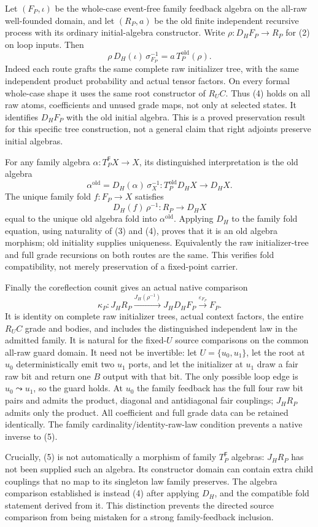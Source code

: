 \documentclass[11pt]{article}
\begin{document}
Let $(F_P,\iota)$ be the whole-case event-free family feedback algebra on the all-raw well-founded domain, and let $(R_P,a)$ be the old finite independent recursive process with its ordinary initial-algebra constructor. Write $\rho:D_HF_P\to R_P$ for (2) on loop inputs. Then
\[
 \rho\,D_H(\iota)\,\sigma_{F_P}^{-1}
       =a\,T_P^{\mathrm{old}}(\rho).                    \tag{4}
\]
Indeed each route grafts the same complete raw initializer tree, with the same independent product probability and actual tensor factors. On every formal whole-case shape it uses the same root constructor of $R_UC$. Thus (4) holds on all raw atoms, coefficients and unused grade maps, not only at selected states. It identifies $D_HF_P$ with the old initial algebra. This is a proved preservation result for this specific tree construction, not a general claim that right adjoints preserve initial algebras.

For any family algebra $\alpha:T_P^{\mathsf F}X\to X$, its distinguished interpretation is the old algebra
\[
 \alpha^{\mathrm{old}}=D_H(\alpha)\,\sigma_X^{-1}:
                   T_P^{\mathrm{old}}D_HX\to D_HX.
\]
The unique family fold $f:F_P\to X$ satisfies
\[
 D_H(f)\,\rho^{-1}:R_P\to D_HX
\]
equal to the unique old algebra fold into $\alpha^{\mathrm{old}}$. Applying $D_H$ to the family fold equation, using naturality of (3) and (4), proves that it is an old algebra morphism; old initiality supplies uniqueness. Equivalently the raw initializer-tree and full grade recursions on both routes are the same. This verifies fold compatibility, not merely preservation of a fixed-point carrier.

Finally the coreflection counit gives an actual native comparison
\[
 \kappa_P:J_HR_P\xrightarrow{J_H(\rho^{-1})}J_HD_HF_P
                         \xrightarrow{\varepsilon_{F_P}}F_P. \tag{5}
\]
It is identity on complete raw initializer trees, actual context factors, the entire $R_UC$ grade and bodies, and includes the distinguished independent law in the admitted family. It is natural for the fixed-$U$ source comparisons on the common all-raw guard domain. It need not be invertible: let $U=\{u_0,u_1\}$, let the root at $u_0$ deterministically emit two $u_1$ ports, and let the initializer at $u_1$ draw a fair raw bit and return one $B$ output with that bit. The only possible loop edge is $u_0\leadsto u_1$, so the guard holds. At $u_0$ the family feedback has the full four raw bit pairs and admits the product, diagonal and antidiagonal fair couplings; $J_HR_P$ admits only the product. All coefficient and full grade data can be retained identically. The family cardinality/identity-raw-law condition prevents a native inverse to (5).

Crucially, (5) is not automatically a morphism of family $T_P^{\mathsf F}$ algebras: $J_HR_P$ has not been supplied such an algebra. Its constructor domain can contain extra child couplings that no map to its singleton law family preserves. The algebra comparison established is instead (4) after applying $D_H$, and the compatible fold statement derived from it. This distinction prevents the directed source comparison from being mistaken for a strong family-feedback inclusion.
\end{document}
